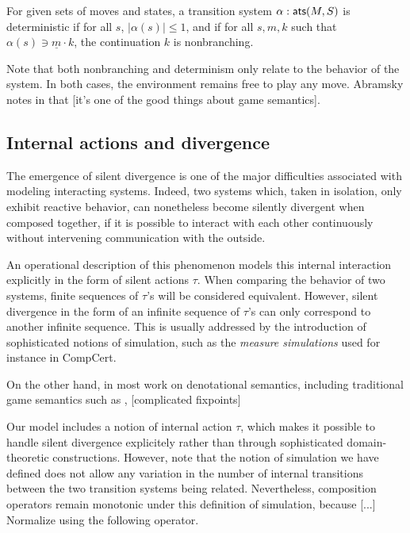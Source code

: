 \begin{definition}
For given sets of moves and states,
a transition system $\alpha :  \mathsf{ats} (M, S)$
is deterministic if for all $s$, $|\alpha(s)| \le 1$,
and if for all $s, m, k$ such that $\alpha(s) \ni \underline{m} \cdot k$,
the continuation $k$ is nonbranching.
\end{definition}

Note that both nonbranching and determinism
only relate to the behavior of the system.
In both cases,
the environment remains free to play any move.
Abramsky notes in \cite{cspgs}
that [it's one of the good things about game semantics].

\subsection{Internal actions and divergence}

The emergence of silent divergence
is one of the major difficulties
associated with modeling interacting systems.
Indeed,
two systems which, taken in isolation,
only exhibit reactive behavior,
can nonetheless become silently divergent when composed together,
if it is possible to interact with each other continuously
without intervening communication with the outside.

An operational description of this phenomenon
models this internal interaction explicitly
in the form of silent actions $\tau$.
When comparing the behavior of two systems,
finite sequences of $\tau$'s will be considered equivalent.
However,
silent divergence in the form of an infinite sequence of $\tau$'s
can only correspond to another infinite sequence.
This is usually addressed by the introduction of
sophisticated notions of simulation,
such as the \emph{measure simulations} used for instance in CompCert.

On the other hand,
in most work on denotational semantics,
including traditional game semantics such as \cite{pcfgs},
[complicated fixpoints] 

Our model includes a notion of internal action $\tau$,
which makes it possible to handle silent divergence explicitely
rather than through sophisticated domain-theoretic constructions.
However,
note that the notion of simulation we have defined
does not allow any variation
in the number of internal transitions
between the two transition systems being related.
Nevertheless,
composition operators remain monotonic
under this definition of simulation,
because [...]
Normalize using the following operator.

